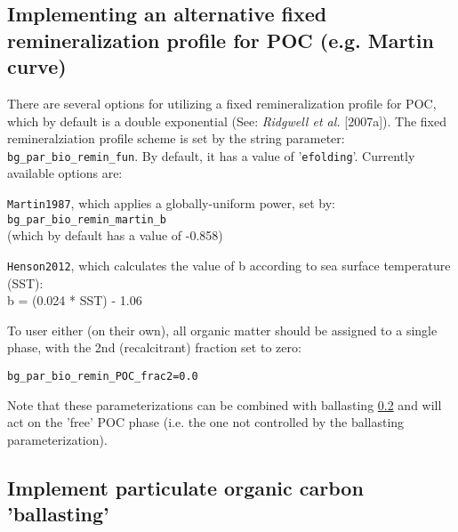 \documentclass[10pt,twoside]{article}
\begin{document}
\subsection{Implementing an alternative fixed remineralization profile for POC (e.g. Martin curve)}\label{fixedremin}

There are several options for utilizing a fixed remineralization profile for POC, which by default is a double exponential (See: \textit{Ridgwell et al.} [2007a]).
The fixed remineralziation profile scheme is set by the string parameter: \texttt{bg\_par\_bio\_remin\_fun}. By default, it has a value of '\texttt{efolding}'. Currently available options are:

\begin{compactitem}
	\item
  \texttt{Martin1987}, which applies a globally-uniform power, set by:
  \\ \texttt{bg\_par\_bio\_remin\_martin\_b}
  \\(which by default has a value of -0.858)
	\item
  \texttt{Henson2012}, which calculates the value of b according to sea surface temperature (SST):
  \\b = (0.024 * SST) - 1.06
\end{compactitem}

To user either (on their own), all organic matter should be assigned to a single phase, with the 2nd (recalcitrant) fraction set to zero:
\vspace{-5.5pt}\begin{verbatim}
bg_par_bio_remin_POC_frac2=0.0
\end{verbatim}\vspace{-5.5pt}

Note that these parameterizations can be combined with ballasting \ref{ballasting} and will act on the 'free' POC phase (i.e. the one not controlled by the ballasting parameterization).




\subsection{Implement particulate organic carbon 'ballasting'}\label{ballasting}
\end{document}
